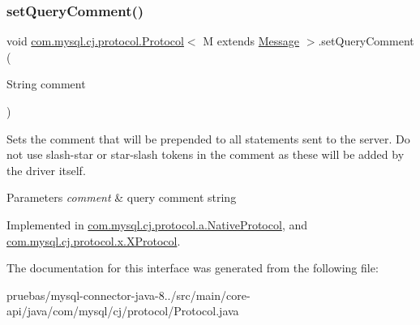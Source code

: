 \subsubsection{\texorpdfstring{set\+Query\+Comment()}{setQueryComment()}}
{\footnotesize\ttfamily void \mbox{\hyperlink{interfacecom_1_1mysql_1_1cj_1_1protocol_1_1_protocol}{com.\+mysql.\+cj.\+protocol.\+Protocol}}$<$ M extends \mbox{\hyperlink{interfacecom_1_1mysql_1_1cj_1_1protocol_1_1_message}{Message}} $>$.set\+Query\+Comment (\begin{DoxyParamCaption}\item[{String}]{comment }\end{DoxyParamCaption})}

Sets the comment that will be prepended to all statements sent to the server. Do not use slash-\/star or star-\/slash tokens in the comment as these will be added by the driver itself.


\begin{DoxyParams}{Parameters}
{\em comment} & query comment string \\
\hline
\end{DoxyParams}


Implemented in \mbox{\hyperlink{classcom_1_1mysql_1_1cj_1_1protocol_1_1a_1_1_native_protocol_a31d74c4c65825a8c0b875831e4884f58}{com.\+mysql.\+cj.\+protocol.\+a.\+Native\+Protocol}}, and \mbox{\hyperlink{classcom_1_1mysql_1_1cj_1_1protocol_1_1x_1_1_x_protocol_ab009a2b06f09d53869c8983bed6c96b8}{com.\+mysql.\+cj.\+protocol.\+x.\+X\+Protocol}}.



The documentation for this interface was generated from the following file\+:\begin{DoxyCompactItemize}
\item 
pruebas/mysql-\/connector-\/java-\/8../src/main/core-\/api/java/com/mysql/cj/protocol/Protocol.\+java\end{DoxyCompactItemize}
